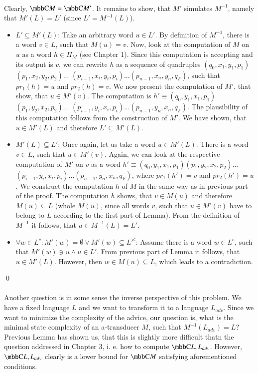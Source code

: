 \paragraph{}
Clearly, $\C{M} = \C{M'}$. It remains to show, that $M'$ simulates $M^{-1}$, namely that $M'(L) = L'$ (since $L' = M^{-1}(L)$).
\begin{itemize}
\item $L' \subseteq M'(L)$: Take an arbitrary word $u \in L'$. By definition of $M^{-1}$, there is a word $v \in L$, such that $M(u) = v$. Now, look at the computation of $M$ on $u$ as a word $h \in \Pi_M$ (see Chapter 1). Since this computation is accepting and its output is $v$, we can rewrite $h$ as a sequence of quadruples $(q_0, x_1, y_1, p_1)$ $(p_1,x_2,y_2,p_2)...$ $(p_{i-1},x_i,y_i,p_i)...$$(p_{n-1},x_n,y_n,q_F)$, such that $pr_1(h) = u$ and $pr_2(h) = v$. We now present the computation of $M'$, that show, that $u \in M'(v)$. The computation is $h' \equiv (q_0, y_1, x_1, p_1)$$(p_1,y_2,x_2,p_2)...$ $(p_{i-1},y_i,x_i,p_i)...$$(p_{n-1},y_n,x_n,q_F)$. The plausibility of this computation follows from the construction of $M'$. We have shown, that $u \in M'(L)$ and therefore $L' \subseteq M'(L)$.
\item $M'(L) \subseteq L'$: Once again, let us take a word $u \in M'(L)$. There is a word $v \in L$, such that $u \in M'(v)$. Again, we can look at the respective computation of $M'$ on $v$ as a word $h' \equiv (q_0, y_1, x_1, p_1)$$(p_1,y_2,x_2,p_2)...$ $(p_{i-1},y_i,x_i,p_i)...$$(p_{n-1},y_n,x_n,q_F)$, where $pr_1(h') = v$ and $pr_2(h') = u$. We construct the computation $h$ of $M$ in the same way as in previous part of the proof. The computation $h$ shows, that $v \in M(u)$ and therefore $M(u) \subseteq L$ (whole $M(u)$, since all words $v$, such that $u \in M'(v)$ have to belong to $L$ according to the first part of Lemma). From the definition of $M^{-1}$ it follows, that $u \in M^{-1}(L) = L'$.
\item $\forall w \in L^c: M'(w) = \emptyset \vee M'(w) \subseteq L'^c$: Assume there is a word $w \in L^c$, such that $M'(w) \ni u \wedge u \in L'$. From previous part of Lemma it follows, that $u \in M'(L)$. However, then $w \in M(u) \subseteq L$, which leads to a contradiction.
\end{itemize} \qed

\paragraph{}
Another question is in some sense the inverse perspective of this problem. We have a fixed language $L$ and we want to transform it to a language $L_{adv}$. Since we want to minimize the complexity of the advice, our question is, what is the minimal state complexity of an a-transducer $M$, such that $M^{-1}(L_{adv}) = L$? Previous Lemma has shown us, that this is slightly more difficult thatn the question addressed in Chapter 3, i. e. how to compute $\C{L, L_{adv}}$. However, $\C{L, L_{adv}}$ clearly is a lower bound for $\C{M}$ satisfying aforementioned conditions.

